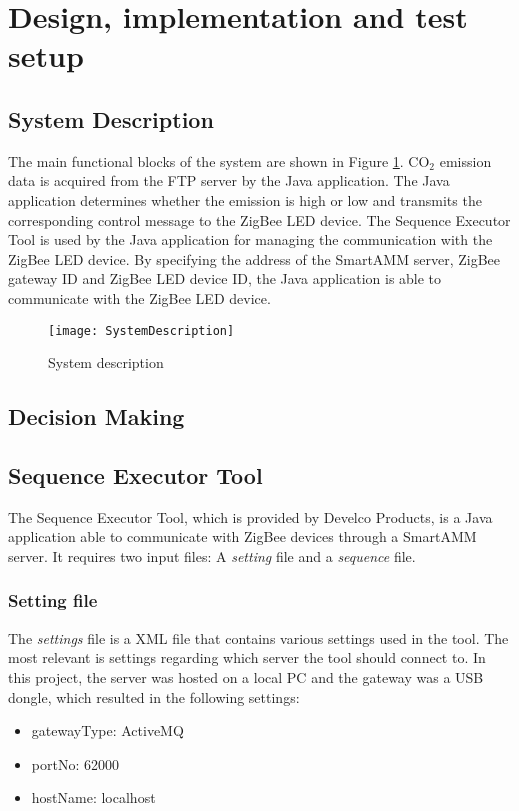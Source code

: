 \documentclass[Main]{subfiles}
\begin{document}
\section{Design, implementation and test setup} %
\label{sec:design_implementation_test_setup}

	\subsection{System Description}
		The main functional blocks of the system are shown in Figure \ref{fig:sysDesc}. 
		CO$_2$ emission data is acquired from the FTP server by the Java application. 
		The Java application determines whether the emission is high or low and transmits the corresponding control message to the ZigBee LED device. 
		The Sequence Executor Tool is used by the Java application for managing the communication with the ZigBee LED device. 
		By specifying the address of the SmartAMM server, ZigBee gateway ID and ZigBee LED device ID, the Java application is able to communicate with the ZigBee LED device.  

		\begin{figure}[H]
		\centering
		\texttt{[image: SystemDescription]}
		\caption{System description}
		\label{fig:sysDesc}
		\end{figure}




	\subsection{Decision Making}


	\newpage
	\subsection{Sequence Executor Tool}
		The Sequence Executor Tool, which is provided by Develco Products, is a Java application able to communicate with ZigBee devices through a SmartAMM server.
		It requires two input files: A \emph{setting} file and a \emph{sequence} file.

		\subsubsection{Setting file}
			The \emph{settings} file is a XML file that contains various settings used in the tool. 
			The most relevant is settings regarding which server the tool should connect to. 
			In this project, the server was hosted on a local PC and the gateway was a USB dongle, which resulted in the following settings:
			\begin{itemize}
				\item gatewayType: ActiveMQ
				\item portNo: 62000
				\item hostName: localhost
			\end{itemize}
\end{document}
